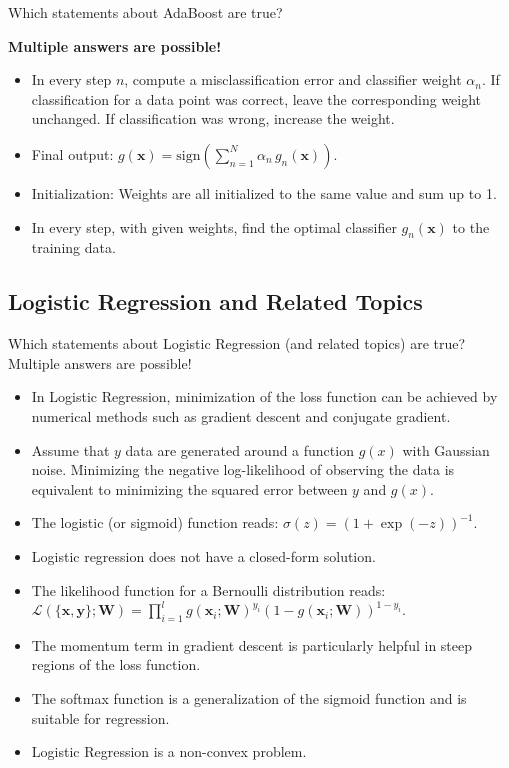 \documentclass{article}
\begin{document}
Which statements about AdaBoost are true?

\textbf{Multiple answers are possible!}

\begin{itemize}
    \item[(a)] In every step \(n\), compute a misclassification error and classifier weight \(\alpha_n\). If classification for a data point was correct, leave the corresponding weight unchanged. If classification was wrong, increase the weight.
    \item[(b)] Final output: \(g(\mathbf{x}) = \text{sign} \left( \sum_{n=1}^N \alpha_n \, g_n(\mathbf{x}) \right)\).
    \item[(c)] Initialization: Weights are all initialized to the same value and sum up to 1.
    \item[(d)] In every step, with given weights, find the optimal classifier \(g_n(\mathbf{x})\) to the training data.
\end{itemize}

\subsection*{Logistic Regression and Related Topics}

Which statements about Logistic Regression (and related topics) are true? Multiple answers are possible!

\begin{itemize}
    \item[(a)] In Logistic Regression, minimization of the loss function can be achieved by numerical methods such as gradient descent and conjugate gradient.
    \item[(b)] Assume that \(y\) data are generated around a function \(g(x)\) with Gaussian noise. Minimizing the negative log-likelihood of observing the data is equivalent to minimizing the squared error between \(y\) and \(g(x)\).
    \item[(c)] The logistic (or sigmoid) function reads: \(\sigma(z) = (1 + \exp(-z))^{-1}\).
    \item[(d)] Logistic regression does not have a closed-form solution.
    \item[(e)] The likelihood function for a Bernoulli distribution reads: \(\mathcal{L}(\{\mathbf{x}, \mathbf{y}\}; \mathbf{W}) = \prod_{i=1}^l g(\mathbf{x}_i; \mathbf{W})^{y_i} (1 - g(\mathbf{x}_i; \mathbf{W}))^{1 - y_i}\).
    \item[(f)] The momentum term in gradient descent is particularly helpful in steep regions of the loss function.
    \item[(g)] The softmax function is a generalization of the sigmoid function and is suitable for regression.
    \item[(h)] Logistic Regression is a non-convex problem.
\end{itemize}
\end{document}
